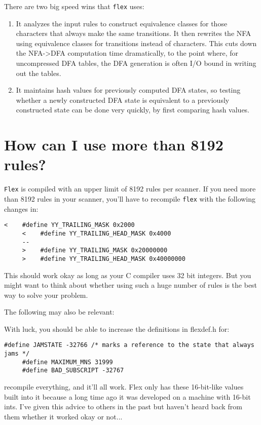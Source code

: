 \documentclass[openany,oneside]{book}
\begin{document}
There are two big speed wins that \verb`flex` uses:
\begin{enumerate}
\item It analyzes the input rules to construct equivalence classes for those
characters that always make the same transitions.  It then rewrites the NFA
using equivalence classes for transitions instead of characters.  This cuts
down the NFA->DFA computation time dramatically, to the point where, for
uncompressed DFA tables, the DFA generation is often I/O bound in writing out
the tables.
\item It maintains hash values for previously computed DFA states, so testing
whether a newly constructed DFA state is equivalent to a previously constructed
state can be done very quickly, by first comparing hash values.
\end{enumerate}

\section{How can I use more than 8192 rules?}


 \verb`Flex` is compiled with an upper limit of 8192 rules per scanner. 
If you need more than 8192 rules in your scanner, you'll have to recompile \verb`flex` with the following changes in:
\begin{verbatim}
<    #define YY_TRAILING_MASK 0x2000
     <    #define YY_TRAILING_HEAD_MASK 0x4000
     --
     >    #define YY_TRAILING_MASK 0x20000000
     >    #define YY_TRAILING_HEAD_MASK 0x40000000
\end{verbatim}


This should work okay as long as your C compiler uses 32 bit integers. 
But you might want to think about whether using such a huge number of rules
is the best way to solve your problem.

The following may also be relevant:

With luck, you should be able to increase the definitions in flexdef.h for:
\begin{verbatim}
#define JAMSTATE -32766 /* marks a reference to the state that always jams */
     #define MAXIMUM_MNS 31999
     #define BAD_SUBSCRIPT -32767
\end{verbatim}


recompile everything, and it'll all work.  Flex only has these 16-bit-like
values built into it because a long time ago it was developed on a machine
with 16-bit ints.  I've given this advice to others in the past but haven't
heard back from them whether it worked okay or not...
\end{document}
